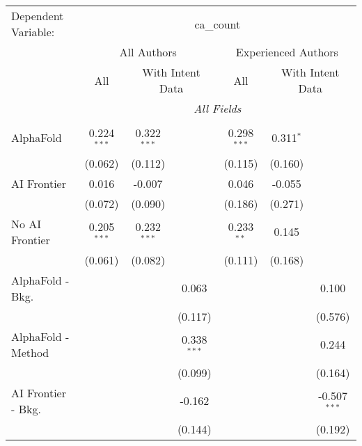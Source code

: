\begingroup
\centering
\begin{tabular}{lcccccc}
   \tabularnewline \midrule \midrule
   Dependent Variable: & \multicolumn{6}{c}{ca\_count}\\
 & \multicolumn{3}{c}{All Authors} & \multicolumn{3}{c}{Experienced Authors} \\
\cmidrule(lr){2-4} \cmidrule(lr){5-7}
 & \multicolumn{1}{c}{All} & \multicolumn{2}{c}{With Intent Data} & \multicolumn{1}{c}{All} & \multicolumn{2}{c}{With Intent Data} \\
\cmidrule(lr){2-2} \cmidrule(lr){3-4} \cmidrule(lr){5-5} \cmidrule(lr){6-7}
 & \multicolumn{6}{c}{\textit{All Fields}} \\ \\
   AlphaFold               & 0.224$^{***}$ & 0.322$^{***}$ &               & 0.298$^{***}$ & 0.311$^{*}$ &   \\   
                           & (0.062)       & (0.112)       &               & (0.115)       & (0.160)     &   \\   
   AI Frontier             & 0.016         & -0.007        &               & 0.046         & -0.055      &   \\   
                           & (0.072)       & (0.090)       &               & (0.186)       & (0.271)     &   \\   
   No AI Frontier          & 0.205$^{***}$ & 0.232$^{***}$ &               & 0.233$^{**}$  & 0.145       &   \\   
                           & (0.061)       & (0.082)       &               & (0.111)       & (0.168)     &   \\   
   AlphaFold - Bkg.        &               &               & 0.063         &               &             & 0.100\\   
                           &               &               & (0.117)       &               &             & (0.576)\\   
   AlphaFold - Method      &               &               & 0.338$^{***}$ &               &             & 0.244\\   
                           &               &               & (0.099)       &               &             & (0.164)\\   
   AI Frontier - Bkg.      &               &               & -0.162        &               &             & -0.507$^{***}$\\   
                           &               &               & (0.144)       &               &             & (0.192)\\   

\end{tabular}
